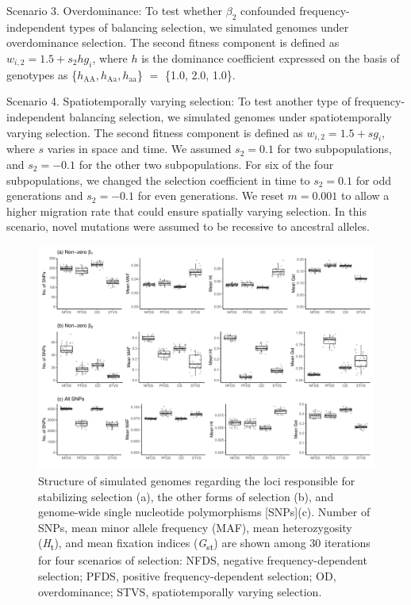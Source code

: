 \documentclass[12pt,]{article}
\begin{document}
Scenario 3. Overdominance: To test whether $\beta_2$ confounded frequency-independent types of balancing selection, we simulated genomes under overdominance selection. The second fitness component is defined as $w_{i,2} = 1.5 + s_2hg_i$, where $h$ is the dominance coefficient expressed on the basis of genotypes as \{$h_\mathrm{AA}, h_\mathrm{Aa}, h_\mathrm{aa}$\} $=$ \{1.0, 2.0, 1.0\}.

Scenario 4. Spatiotemporally varying selection: To test another type of frequency-independent balancing selection, we simulated genomes under spatiotemporally varying selection. The second fitness component is defined as $w_{i,2} = 1.5 + s g_i$, where $s$ varies in space and time. We assumed $s_2=0.1$ for two subpopulations, and $s_2=-0.1$ for the other two subpopulations. For six of the four subpopulations, we changed the selection coefficient in time to $s_2=0.1$ for odd generations and $s_2=-0.1$ for even generations. We reset $m=0.001$ to allow a higher migration rate that could ensure spatially varying selection. In this scenario, novel mutations were assumed to be recessive to ancestral alleles.

\begin{figure}[ht]
  \includegraphics[width=\linewidth]{SimGenomeSummary.pdf}
  \caption{Structure of simulated genomes regarding the loci responsible for stabilizing selection (a), the other forms of selection (b), and genome-wide single nucleotide polymorphisms [SNPs](c). Number of SNPs, mean minor allele frequency (MAF), mean heterozygosity (\textit{H}\textsubscript{t}), and mean fixation indices (\textit{G}\textsubscript{st}) are shown among 30 iterations for four scenarios of selection: NFDS, negative frequency-dependent selection; PFDS, positive frequency-dependent selection; OD, overdominance; STVS, spatiotemporally varying selection.}
  \label{figS4:GenStr}
\end{figure}
\end{document}
